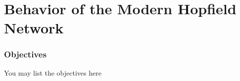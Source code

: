 
\section{Behavior of the Modern Hopfield Network}
\begin{frame}
	
\frametitle{Objectives}

You may list the objectives here\\~\\


\end{frame}

